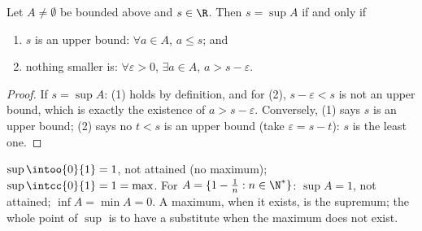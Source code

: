 \begin{proposition}\label{prop:b1:reals:epsilon}
Let $A \neq \emptyset$ be bounded above and $s \in \R$. Then $s =
\sup A$ if and only if
\begin{enumerate}
  \item $s$ is an upper bound: $\forall a \in A$, $a \leq s$; and
  \item nothing smaller is: $\forall \varepsilon > 0$, $\exists a \in
        A$, $a > s - \varepsilon$.
\end{enumerate}
\end{proposition}

\begin{proof}
If $s = \sup A$: (1) holds by definition, and for (2), $s -
\varepsilon < s$ is not an upper bound, which is exactly the
existence of $a > s - \varepsilon$. Conversely, (1) says $s$ is an
upper bound; (2) says no $t < s$ is an upper bound (take $\varepsilon
= s - t$): $s$ is the least one.
\end{proof}

\begin{example}\label{ex:b1:reals:supexamples}
$\sup \intoo{0}{1} = 1$, not attained (no maximum);
$\sup \intcc{0}{1} = 1 = \max$. For $A = \{1 - \frac 1n : n \in
\N^*\}$: $\sup A = 1$, not attained; $\inf A = \min A = 0$. A maximum,
when it exists, is the supremum; the whole point of $\sup$ is to have
a substitute when the maximum does not exist.
\end{example}

